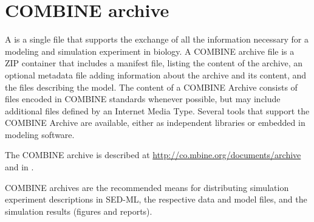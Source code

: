 \chapter{COMBINE archive}
\label{app:archive}

A  \citep{Bergmann2014} is a single file that supports the exchange of all the information necessary for a modeling and simulation experiment in biology. A COMBINE archive file is a ZIP container that includes a manifest file, listing the content of the archive, an optional metadata file adding information about the archive and its content, and the files describing the model. The content of a COMBINE Archive consists of files encoded in COMBINE standards whenever possible, but may include additional files defined by an Internet Media Type. Several tools that support the COMBINE Archive are available, either as independent libraries or embedded in modeling software.

The COMBINE archive is described at \url{http://co.mbine.org/documents/archive} and 
in \citep{Bergmann2014}.

COMBINE archives are the recommended means for distributing simulation experiment descriptions in SED-ML, the respective data and model files, and the simulation results (figures and reports).

